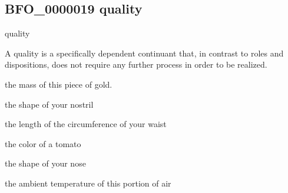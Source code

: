 \documentclass[letterpaper,10pt,english]{sphinxmanual}
\begin{document}
\begin{sphinxShadowBox}

\sphinxAtStartPar
{}
\end{sphinxShadowBox}
\begin{quote}

\ignorespaces \end{quote}


\subsection{BFO\_0000019 \sphinxhyphen{} quality}
\label{\detokenize{doc-BFO_0000019:bfo-0000019-quality}}\label{\detokenize{doc-BFO_0000019:index-0}}\label{\detokenize{doc-BFO_0000019::doc}}
\begin{sphinxShadowBox}

\sphinxAtStartPar
quality
\end{sphinxShadowBox}

\begin{sphinxShadowBox}

\sphinxAtStartPar
A quality is a specifically dependent continuant that, in contrast to roles and dispositions, does not require any further process in order to be realized.
\end{sphinxShadowBox}

\begin{sphinxShadowBox}

\sphinxAtStartPar
the mass of this piece of gold.

\sphinxAtStartPar
the shape of your nostril

\sphinxAtStartPar
the length of the circumference of your waist

\sphinxAtStartPar
the color of a tomato

\sphinxAtStartPar
the shape of your nose

\sphinxAtStartPar
the ambient temperature of this portion of air
\end{sphinxShadowBox}

\begin{sphinxShadowBox}

\sphinxAtStartPar
{}
\end{sphinxShadowBox}
\begin{quote}

\ignorespaces \end{quote}
\end{document}
